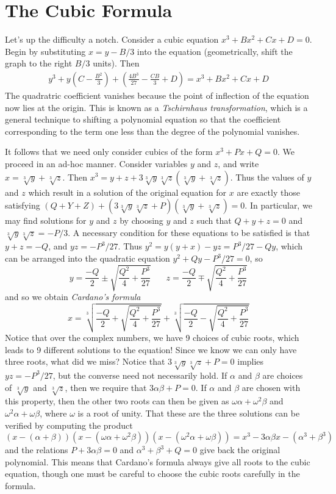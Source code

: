 \section{The Cubic Formula}

Let's up the difficulty a notch. Consider a cubic equation $x^3 + Bx^2 + Cx + D = 0$. Begin by substituting $x = y - B/3$ into the equation (geometrically, shift the graph to the right $B/3$ units). Then
%
\begin{align*}
   y^3 + y\left(C - \frac{B^2}{3}\right) + \left( \frac{4B^3}{27} - \frac{CB}{3} + D \right) = x^3 + Bx^2 + Cx + D
\end{align*}
%
The quadratric coefficient vanishes because the point of inflection of the equation now lies at the origin. This is known as a \emph{Tschirnhaus transformation}, which is a general technique to shifting a polynomial equation so that the coefficient corresponding to the term one less than the degree of the polynomial vanishes.

It follows that we need only consider cubics of the form $x^3 + Px + Q = 0$. We proceed in an ad-hoc manner. Consider variables $y$ and $z$, and write $x = \sqrt[3]{y} + \sqrt[3]{z}$. Then $x^3 = y + z + 3\sqrt[3]{y}\sqrt[3]{z}(\sqrt[3]{y} + \sqrt[3]{z})$. Thus the values of $y$ and $z$ which result in a solution of the original equation for $x$ are exactly those satisfying $(Q + Y + Z) + (3\sqrt[3]{y}\sqrt[3]{z} + P)(\sqrt[3]{y} + \sqrt[3]{z}) = 0$. In particular, we may find solutions for $y$ and $z$ by choosing $y$ and $z$ such that $Q + y + z = 0$ and $\sqrt[3]{y} \sqrt[3]{z} = -P/3$. A necessary condition for these equations to be satisfied is that $y + z = -Q$, and $yz = -P^3/27$. Thus $y^2 = y(y + x) - yz = P^3/27 - Qy$, which can be arranged into the quadratic equation $y^2 + Qy - P^3/27 = 0$, so
%
\[ y = \frac{-Q}{2} \pm \sqrt{\frac{Q^2}{4} + \frac{P^3}{27}}\ \ \ \ \ \ \ \ z = \frac{-Q}{2} \mp \sqrt{\frac{Q^2}{4} + \frac{P^3}{27}} \]
%
and so we obtain \emph{Cardano's formula}
%
\[ x = \sqrt[3]{\frac{-Q}{2} + \sqrt{\frac{Q^2}{4} + \frac{P^3}{27}}} + \sqrt[3]{\frac{-Q}{2} - \sqrt{\frac{Q^2}{4} + \frac{P^3}{27}}} \]
%
Notice that over the complex numbers, we have 9 choices of cubic roots, which leads to 9 different solutions to the equation! Since we know we can only have three roots, what did we miss? Notice that $3\sqrt[3]{y}\sqrt[3]{z} + P = 0$ implies $yz = -P^3/27$, but the converse need not necessarily hold. If $\alpha$ and $\beta$ are choices of $\sqrt[3]{y}$ and $\sqrt[3]{z}$, then we require that $3\alpha\beta + P = 0$. If $\alpha$ and $\beta$ are chosen with this property, then the other two roots can then be given as $\omega \alpha + \omega^2 \beta$ and $\omega^2 \alpha + \omega \beta$, where $\omega$ is a root of unity. That these are the three solutions can be verified by computing the product
%
\[ (x - (\alpha + \beta))(x - (\omega \alpha + \omega^2 \beta)) (x - (\omega^2 \alpha + \omega \beta)) = x^3 - 3\alpha \beta x - (\alpha^3 + \beta^3) \]
%
and the relations $P + 3 \alpha \beta = 0$ and $\alpha^3 + \beta^3 + Q = 0$ give back the original polynomial. This means that Cardano's formula always give all roots to the cubic equation, though one must be careful to choose the cubic roots carefully in the formula.

